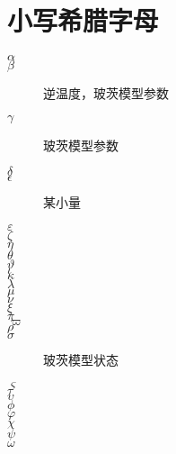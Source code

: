 \documentclass{ctexart}
\begin{document}
\section{小写希腊字母}
\begin{description}
    \item[$\alpha$]
    \item[$\beta $] 逆温度，玻茨模型参数
    \item[$\gamma$ ] 玻茨模型参数
    \item[$\delta $]
    \item[$\epsilon$ ] 某小量
    \item[$\varepsilon$ ] 
    \item[$\zeta$]
    \item[$\eta$]
    \item[$\theta$]
    \item[$\vartheta$]
    \item[$\iota$]
    \item[$\kappa$]
    \item[$\lambda$]
    \item[$\mu$]
    \item[$\nu$]
    \item[$\xi$]
    \item[$\pi$]
    \item[$\varpi$]
    \item[$\rho $]
    \item[$\sigma$] 玻茨模型状态
    \item[$\varsigma$]
    \item[$\tau $]
    \item[$\upsilon$ ]
    \item[$\phi $]
    \item[$\varphi $]
    \item[$\chi $]
    \item[$\psi$ ]
    \item[$\omega $]

\end{description}
\end{document}
